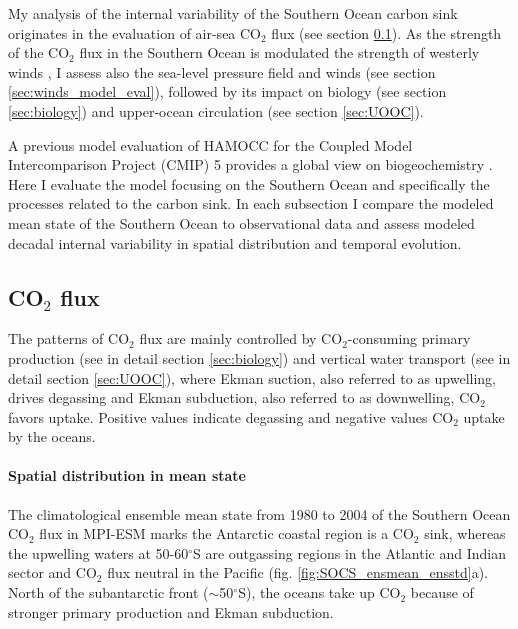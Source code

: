 \documentclass[12pt]{article}
\begin{document}

My analysis of the internal variability of the Southern Ocean carbon sink originates in the evaluation of air-sea CO$_2$ flux (see section  \ref{sec:co2flux_model_eval}). As the strength of the CO$_2$ flux in the Southern Ocean is modulated the strength of westerly winds \citep{Lovenduski2007}, I assess also the sea-level pressure field and  winds (see section \ref{sec:winds_model_eval}), followed by its impact on biology (see section \ref{sec:biology}) and upper-ocean circulation (see section \ref{sec:UOOC}).

A previous model evaluation of HAMOCC for the Coupled Model Intercomparison Project (CMIP) 5 provides a global view on biogeochemistry \citep{Ilyina2013}. Here I evaluate the model focusing on the Southern Ocean and specifically the processes related to the carbon sink. In each subsection I compare the modeled mean state of the Southern Ocean to observational data and assess modeled decadal internal variability in spatial distribution and temporal evolution. 


 

\subsection{CO$_2$ flux}
\label{sec:co2flux_model_eval}

The patterns of CO$_2$ flux are mainly controlled by CO$_2$-consuming primary production (see in detail section \ref{sec:biology}) and vertical water transport (see in detail section \ref{sec:UOOC}), where Ekman suction, also referred to as upwelling, drives degassing and Ekman subduction, also referred to as downwelling, CO$_2$ favors uptake. Positive values indicate degassing and negative values CO$_2$ uptake by the oceans. %

\paragraph{Spatial distribution in mean state} 
The climatological ensemble mean state from 1980 to 2004 of the Southern Ocean CO$_2$ flux in MPI-ESM marks the Antarctic coastal region is a CO$_2$ sink, whereas the upwelling waters at 50-60$^\circ$S are outgassing regions in the Atlantic and Indian sector and CO$_2$ flux neutral in the Pacific (fig. \ref{fig:SOCS_ensmean_ensstd}a).  North of the subantarctic front ($\sim$50$^\circ$S), the oceans take up CO$_2$ because of stronger primary production and Ekman subduction. 
\end{document}
